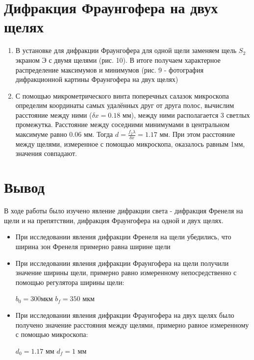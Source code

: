 \documentclass[a4paper]{article}
\begin{document}
\section{Дифракция Фраунгофера на двух щелях}

\begin{enumerate}
     \item В установке для дифракции Фраунгофера для одной щели заменяем щель $S_2$ экраном Э с двумя щелями (рис. 10). В итоге получаем характерное распределение максимумов и минимумов (рис. 9 - фотография дифракционной картины Фраунгофера на двух щелях)


\item С помощью микрометрического винта поперечных салазок микроскопа определим координаты самых удалённых друг от друга полос, вычислим расстояние между ними ($\delta x = 0.18$ мм), между ними располагается 3 светлых промежутка. Расстояние между соседними минимумами в центральном максимуме равно $0.06$ мм. Тогда $d = \frac{f_2 \lambda}{\delta x} = 1.17$ мм. При этом расстояние между щелями, измеренное с помощью микроскопа, оказалось равным 1мм, значения совпадают.
\end{enumerate}

\newpage
\newpage

\section{Вывод}

В ходе работы было изучено явление дифракции света - дифракция Френеля на щели и на препятствии, дифракция Фраунгофера на одной и двух щелях.

\begin{itemize}
    \item При исследовании явления дифракции Френеля на щели убедились, что ширина зон Френеля примерно равна ширине щели
    
    \item При исследовании явления дифракции Фраунгофера на щели получили значение ширины щели, примерно равно измеренному непосредственно с помощью регулятора ширины щели:
    \begin{center}
        $b_0 = 300 $мкм \hspace{1cm} $b_f = 350$ мкм
    \end{center}
    
    \item При исследовании явления дифракции Фраунгофера на двух щелях было получено значение расстояния между щелями, примерно равное измеренному с помощью микроскопа:
    
    \begin{center}
        $d_0 = 1.17$ мм \hspace{1cm} $d_f = 1$ мм
    \end{center}
\end{itemize}
\end{document}
